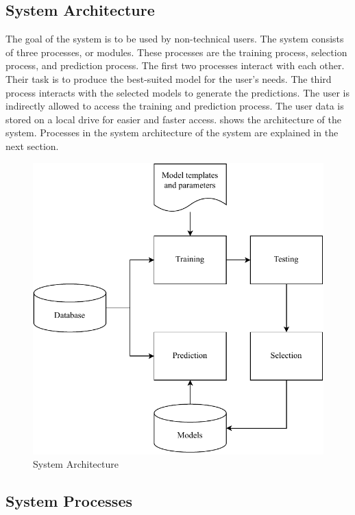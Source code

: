 \documentclass[a4paper,fleqn]{cas-dc}
\begin{document}
\subsection{System Architecture}\label{subsec:system_architecture}

The goal of the system is to be used by non-technical users. The system consists of three processes, or modules. These processes are the training process, selection process, and prediction process. The first two processes interact with each other. Their task is to produce the best-suited model for the user's needs. The third process interacts with the selected models to generate the predictions. The user is indirectly allowed to access the training and prediction process. The user data is stored on a local drive for easier and faster access.  shows the architecture of the system. Processes in the system architecture of the system are explained in the next section.

\begin{figure}[ht]
    \centering
    \includegraphics[width=0.9\columnwidth]{system_architecture.pdf}
    \caption{System Architecture}
    \label{fig:system_architecture}
\end{figure}

\subsection{System Processes}\label{subsec:system_processes}
\end{document}
